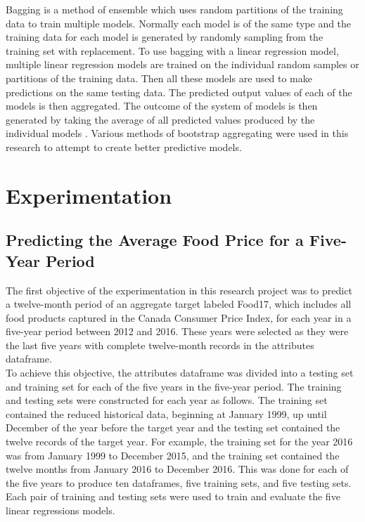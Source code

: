 \documentclass[12pt]{dalthesis}
\begin{document}
Bagging is a method of ensemble which uses random partitions of the training data to train multiple models. Normally each model is of the same type and the training data for each model is generated by randomly sampling from the training set with replacement. To use bagging with a linear regression model, multiple linear regression models are trained on the individual random samples or partitions of the training data. Then all these models are used to make predictions on the same testing data. The predicted output values of each of the models is then aggregated. The outcome of the system of models is then generated by taking the average of all predicted values produced by the individual models \cite{bagging}. Various methods of bootstrap aggregating were used in this research to attempt to create better predictive models. 





\chapter{Experimentation}

\section{Predicting the Average Food Price for a Five-Year Period}


The first objective of the experimentation in this research project was to predict a twelve-month period of an aggregate target labeled Food17, which includes all food products captured in the Canada Consumer Price Index, for each year in a five-year period between 2012 and 2016. These years were selected as they were the last five years with complete twelve-month records in the attributes dataframe.\\ 

To achieve this objective, the attributes dataframe was divided into a testing set and training set for each of the five years in the five-year period. The training and testing sets were constructed for each year as follows. The training set contained the reduced historical data, beginning at January 1999, up until December of the year before the target year and the testing set contained the twelve records of the target year. For example, the training set for the year 2016 was from January 1999 to December 2015, and the training set contained the twelve months from January 2016 to December 2016. This was done for each of the five years to produce ten dataframes, five training sets, and five testing sets. Each pair of training and testing sets were used to train and evaluate the five linear regressions models. \\
\end{document}
